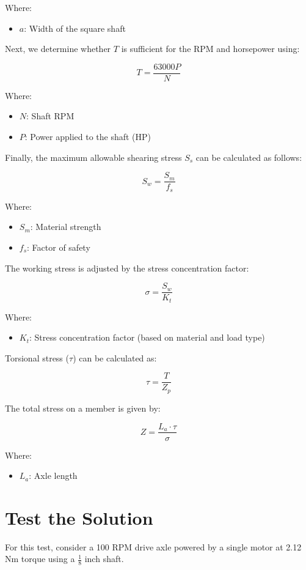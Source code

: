 Where:
\begin{itemize}
	\item \(a\): Width of the square shaft
\end{itemize}

Next, we determine whether \(T\) is sufficient for the RPM and horsepower using:

\[
T = \frac{63000P}{N}
\]

Where:
\begin{itemize}
	\item \(N\): Shaft RPM
	\item \(P\): Power applied to the shaft (HP)
\end{itemize}

Finally, the maximum allowable shearing stress \(S_s\) can be calculated as follows:

\[
S_w = \frac{S_m}{f_s}
\]

Where:
\begin{itemize}
	\item \(S_m\): Material strength
	\item \(f_s\): Factor of safety
\end{itemize}

The working stress is adjusted by the stress concentration factor:

\[
\sigma = \frac{S_w}{K_t}
\]

Where:
\begin{itemize}
	\item \(K_t\): Stress concentration factor (based on material and load type)
\end{itemize}

Torsional stress (\(\tau\)) can be calculated as:

\[
\tau = \frac{T}{Z_p}
\]

The total stress on a member is given by:

\[
Z = \frac{L_a \cdot \tau}{\sigma}
\]

Where:
\begin{itemize}
	\item \(L_a\): Axle length
\end{itemize}
\section*{Test the Solution}
For this test, consider a 100 RPM drive axle powered by a single motor at 2.12 Nm torque using a $\frac{1}{8}$
inch shaft.

